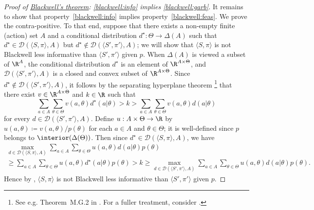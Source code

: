 \begin{proof}[Proof of {\hyperref[theorem:blackwell]{Blackwell's theorem}}: \ref{blackwell:info} implies \ref{blackwell:garb}]
	It remains to show that property~\ref{blackwell:info} implies property~\ref{blackwell:feas}. We prove the contra-positive. To that end, suppose that there exists a non-empty finite (action) set $A$ and a conditional distribution $d^\star : \Theta \to \Delta(A)$ such that $d^\star \in \mathcal{D}(\langle S, \pi \rangle ,A)$ but $d^\star \notin \mathcal{D}(\langle S', \pi' \rangle ,A)$; we will show that $\langle S, \pi \rangle $ is not Blackwell less informative than $\langle S', \pi' \rangle $ given $p$. When $\Delta(A)$ is viewed a subset of $\R^A$, the conditional distribution $d^\star$ is an element of $\R^{A \times \Theta}$, and $\mathcal{D}(\langle S', \pi' \rangle ,A)$ is a closed and convex subset of $\R^{A \times \Theta}$. Since $d^\star \notin \mathcal{D}(\langle S', \pi' \rangle ,A)$, it follows by the separating hyperplane theorem%
		\footnote{See e.g. Theorem~M.G.2 in \textcite[][p.~948]{MascolellWhinstonGreen1995}. For a fuller treatment, consider \textcite{Border2016}.}
	that there exist $v \in \R^{A \times \Theta}$ and $k \in \R$ such that
	\begin{equation*}
		\sum_{a \in A} \sum_{\theta \in \Theta} v(a,\theta) d^\star(a|\theta)
		> k
		> \sum_{a \in A} \sum_{\theta \in \Theta} v(a,\theta) d(a|\theta)
	\end{equation*}
	for every $d \in \mathcal{D}(\langle S', \pi' \rangle ,A)$. Define $u : A \times \Theta \to \R$ by $u(a,\theta) \coloneqq v(a,\theta)/p(\theta)$ for each $a \in A$ and $\theta \in \Theta$; it is well-defined since $p$ belongs to $\interior(\Delta(\Theta))$. Then since $d^\star \in \mathcal{D}(\langle S, \pi \rangle ,A)$, we have
	\begin{multline*}
		\max_{d \in \mathcal{D}(\langle S, \pi \rangle ,A)}
		\sum_{a \in A} \sum_{\theta \in \Theta} u(a,\theta) d(a|\theta) p(\theta)
		\\
		\geq \sum_{a \in A} \sum_{\theta \in \Theta} u(a,\theta) d^\star(a|\theta) p(\theta)
		> k \geq \max_{d \in \mathcal{D}(\langle S', \pi' \rangle ,A)} \sum_{a \in A} \sum_{\theta \in \Theta}
		u(a,\theta) d(a|\theta) p(\theta) .
	\end{multline*}
	Hence by , $\langle S, \pi \rangle $ is not Blackwell less informative than $\langle S', \pi' \rangle $ given $p$.
\end{proof}
